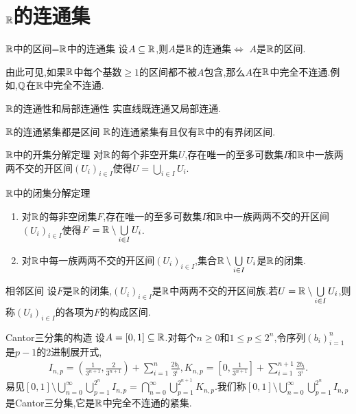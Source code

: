 \section{\texorpdfstring{$\mathbb{R}$}{R}的连通集}

\begin{theorem}{$\mathbb{R}$中的区间=$\mathbb{R}$中的连通集}{}
	设$A\subseteq\mathbb{R}$,则$A$是$\mathbb{R}$的连通集$\iff$ $A$是$\mathbb{R}$的区间.
\end{theorem}

\begin{remark}{}{}
	由此可见,如果$\mathbb{R}$中每个基数$\geq 1$的区间都不被$A$包含,那么$A$在$\mathbb{R}$中完全不连通.例如,$\mathbb{Q}$在$\mathbb{R}$中完全不连通.
\end{remark}

\begin{corollary}{$\mathbb{R}$的连通性和局部连通性}{}
	实直线既连通又局部连通.
\end{corollary}

\begin{corollary}{$\mathbb{R}$的连通紧集都是区间}{}
	$\mathbb{R}$的连通紧集有且仅有$\mathbb{R}$中的有界闭区间.
\end{corollary}

\begin{proposition}{$\mathbb{R}$中的开集分解定理}{}
	对$\mathbb{R}$的每个非空开集$U$,存在唯一的至多可数集$I$和$\mathbb{R}$中一族两两不交的开区间$\left(U_{i}\right)_{i\in I}$使得$U=\bigcup\limits_{i\in I}U_{i}$.
\end{proposition}

\begin{corollary}{$\mathbb{R}$中的闭集分解定理}{}
	\begin{enumerate}
		\item 对$\mathbb{R}$的每非空闭集$F$,存在唯一的至多可数集$I$和$\mathbb{R}$中一族两两不交的开区间$\left(U_{i}\right)_{i\in I}$使得$F=\mathbb{R}\setminus\bigcup\limits_{i\in I}U_{i}$.
		\item 对$\mathbb{R}$中每一族两两不交的开区间$\left(U_{i}\right)_{i\in I}$,集合$\mathbb{R}\setminus\bigcup\limits_{i\in I}U_{i}$是$\mathbb{R}$的闭集.
	\end{enumerate}
\end{corollary}

\begin{definition}{相邻区间}{}
	设$F$是$\mathbb{R}$的闭集,$\left(U_{i}\right)_{i\in I}$是$\mathbb{R}$中两两不交的开区间族.若$U=\mathbb{R}\setminus\bigcup\limits_{i\in I}U_{i}$,则称$\left(U_{i}\right)_{i\in I}$的各项为$F$的构成区间.
\end{definition}

\begin{example}{Cantor三分集的构造}{}
	设$A=\left[0,1\right]\subseteq\mathbb{R}$.对每个$n\geq 0$和$1\leq p\leq 2^{n}$,令序列$\left(b_{i}\right)_{i=1}^{n}$是$p-1$的$2$进制展开式,
	\begin{align*}
		I_{n,p}=\left(\frac{1}{3^{n+1}},\frac{2}{3^{n+1}}\right)+\sum\limits_{i=1}^{n}\frac{2b_{i}}{3^{i}},K_{n,p}=\left[0,\frac{1}{3^{n+1}}\right]+\sum\limits_{i=1}^{n+1}\frac{2b_{i}}{3^{i}}.
	\end{align*}
	易见$\left[0,1\right]\setminus\bigcup\limits_{n=0}^{\infty}\bigcup\limits_{p=1}^{2^{n}}I_{n,p}=\bigcap\limits_{n=0}^{\infty}\bigcup\limits_{p=1}^{2^{n+1}}K_{n,p}$.我们称$\left[0,1\right]\setminus\bigcup\limits_{n=0}^{\infty}\bigcup\limits_{p=1}^{2^{n}}I_{n,p}$是Cantor三分集,它是$\mathbb{R}$中完全不连通的紧集.
\end{example}